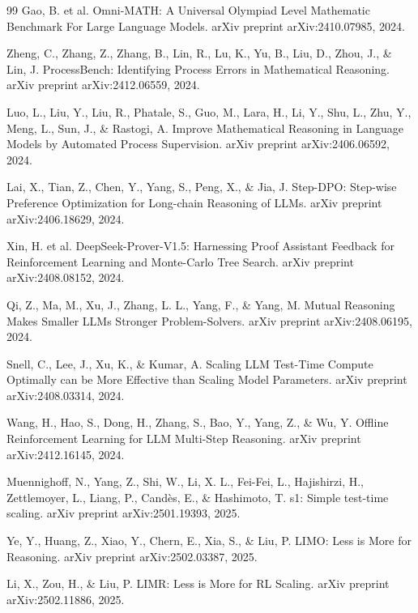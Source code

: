 \documentclass[12pt,a4paper]{ctexart}
\begin{document}
\begin{thebibliography}{99}
Gao, B. et al. Omni-MATH: A Universal Olympiad Level Mathematic Benchmark For Large Language Models. arXiv preprint arXiv:2410.07985, 2024.

Zheng, C., Zhang, Z., Zhang, B., Lin, R., Lu, K., Yu, B., Liu, D., Zhou, J., \& Lin, J. ProcessBench: Identifying Process Errors in Mathematical Reasoning. arXiv preprint arXiv:2412.06559, 2024.

Luo, L., Liu, Y., Liu, R., Phatale, S., Guo, M., Lara, H., Li, Y., Shu, L., Zhu, Y., Meng, L., Sun, J., \& Rastogi, A. Improve Mathematical Reasoning in Language Models by Automated Process Supervision. arXiv preprint arXiv:2406.06592, 2024.

Lai, X., Tian, Z., Chen, Y., Yang, S., Peng, X., \& Jia, J. Step-DPO: Step-wise Preference Optimization for Long-chain Reasoning of LLMs. arXiv preprint arXiv:2406.18629, 2024.

Xin, H. et al. DeepSeek-Prover-V1.5: Harnessing Proof Assistant Feedback for Reinforcement Learning and Monte-Carlo Tree Search. arXiv preprint arXiv:2408.08152, 2024.

Qi, Z., Ma, M., Xu, J., Zhang, L. L., Yang, F., \& Yang, M. Mutual Reasoning Makes Smaller LLMs Stronger Problem-Solvers. arXiv preprint arXiv:2408.06195, 2024.

Snell, C., Lee, J., Xu, K., \& Kumar, A. Scaling LLM Test-Time Compute Optimally can be More Effective than Scaling Model Parameters. arXiv preprint arXiv:2408.03314, 2024.

Wang, H., Hao, S., Dong, H., Zhang, S., Bao, Y., Yang, Z., \& Wu, Y. Offline Reinforcement Learning for LLM Multi-Step Reasoning. arXiv preprint arXiv:2412.16145, 2024.

Muennighoff, N., Yang, Z., Shi, W., Li, X. L., Fei-Fei, L., Hajishirzi, H., Zettlemoyer, L., Liang, P., Cand{\`e}s, E., \& Hashimoto, T. s1: Simple test-time scaling. arXiv preprint arXiv:2501.19393, 2025.

Ye, Y., Huang, Z., Xiao, Y., Chern, E., Xia, S., \& Liu, P. LIMO: Less is More for Reasoning. arXiv preprint arXiv:2502.03387, 2025.

Li, X., Zou, H., \& Liu, P. LIMR: Less is More for RL Scaling. arXiv preprint arXiv:2502.11886, 2025.
\end{thebibliography}
\end{document}
